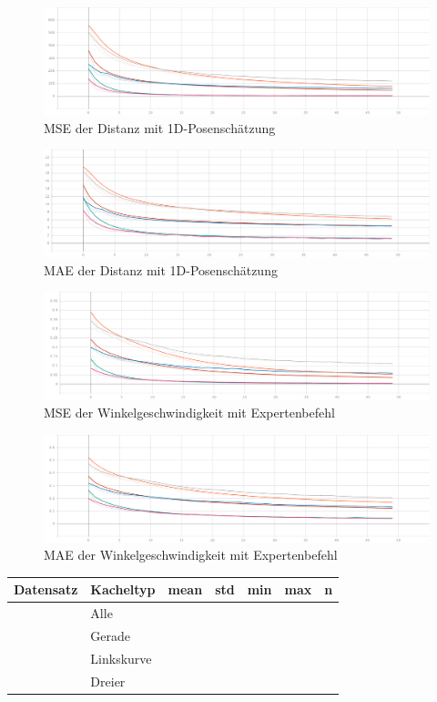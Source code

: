\begin{figure}[H]
	\centering
	\includegraphics[width=\linewidth]{kapitel5/images/d-only/Loss-d-only.png}
	\caption{MSE der Distanz mit 1D-Posenschätzung}
	\label{1d-poses-mse-d}
\end{figure}

\begin{figure}[H]
	\centering
	\includegraphics[width=\linewidth]{kapitel5/images/d-only/Mean_Abs_Error_d-d-only.png}
	\caption{MAE der Distanz mit 1D-Posenschätzung}
	\label{1d-poses-mae-d}
\end{figure}



\begin{figure}[H]
	\centering
	\includegraphics[width=\linewidth]{kapitel5/images/expert/Loss-expert.png}
	\caption{MSE der Winkelgeschwindigkeit mit Expertenbefehl}
	\label{expert-mse-omega}
\end{figure}

\begin{figure}[H]
	\centering
	\includegraphics[width=\linewidth]{kapitel5/images/expert/Mean_Abs_Error_omega-expert.png}
	\caption{MAE der Winkelgeschwindigkeit mit Expertenbefehl}
	\label{expert-mae-omega}
\end{figure}


\begin{table}
	\begin{tabular}[t]{|l|l|r|r|r|r|r|}
		\hline
		\multirow{5}{*}{Datensatz} &
		Kacheltyp & mean & std & min & max & n \\
		\hline
		 & Alle \\
		\hline
		 & Gerade \\
		\hline
		 & Linkskurve \\
		\hline
		 & Dreier \\
		\hline
	\end{tabular}
\end{table}